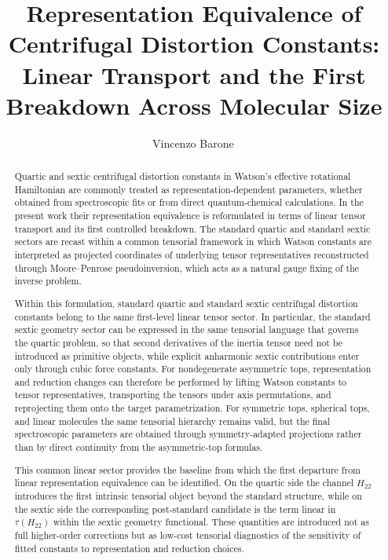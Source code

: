 \documentclass[aip,jcp,reprint,floatfix]{revtex4-2}
\begin{document}
\title{Representation Equivalence of Centrifugal Distortion Constants: Linear Transport and the First Breakdown Across Molecular Size}

\author{Vincenzo Barone\,}

\begin{abstract}
Quartic and sextic centrifugal distortion constants in Watson's
effective rotational Hamiltonian are commonly treated as
representation-dependent parameters, whether obtained from
spectroscopic fits or from direct quantum-chemical calculations.
In the present work their representation equivalence is reformulated
in terms of linear tensor transport and its first controlled
breakdown. The standard quartic and standard sextic sectors are
recast within a common tensorial framework in which Watson constants
are interpreted as projected coordinates of underlying tensor
representatives reconstructed through Moore--Penrose pseudoinversion,
which acts as a natural gauge fixing of the inverse problem.

Within this formulation, standard quartic and standard sextic
centrifugal distortion constants belong to the same first-level
linear tensor sector. In particular, the standard sextic geometry
sector can be expressed in the same tensorial language that governs
the quartic problem, so that second derivatives of the inertia tensor
need not be introduced as primitive objects, while explicit
anharmonic sextic contributions enter only through cubic force
constants. For nondegenerate asymmetric tops, representation and
reduction changes can therefore be performed by lifting Watson
constants to tensor representatives, transporting the tensors under
axis permutations, and reprojecting them onto the target
parametrization. For symmetric tops, spherical tops, and linear
molecules the same tensorial hierarchy remains valid, but the final
spectroscopic parameters are obtained through symmetry-adapted
projections rather than by direct continuity from the asymmetric-top
formulas.

This common linear sector provides the baseline from which the first
departure from linear representation equivalence can be identified.
On the quartic side the channel $H_{22}$ introduces the first
intrinsic tensorial object beyond the standard structure, while on
the sextic side the corresponding post-standard candidate is the term
linear in $\tau(H_{22})$ within the sextic geometry functional. These
quantities are introduced not as full higher-order corrections but as
low-cost tensorial diagnostics of the sensitivity of fitted constants
to representation and reduction choices.


\end{abstract}
\end{document}
